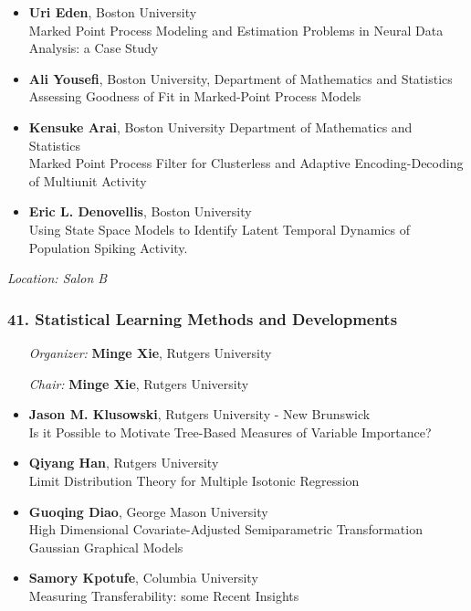 \begin{itemize}
\item \textbf{Uri Eden}, Boston University \\
Marked Point Process Modeling and Estimation Problems in Neural Data Analysis: a Case Study
\item \textbf{Ali Yousefi}, Boston University, Department of Mathematics and Statistics \\
Assessing Goodness of Fit in Marked-Point Process Models
\item \textbf{Kensuke Arai}, Boston University Department of Mathematics and Statistics \\
Marked Point Process Filter for Clusterless and Adaptive Encoding-Decoding of Multiunit Activity
\item \textbf{Eric L. Denovellis}, Boston University \\
Using State Space Models to Identify Latent Temporal Dynamics of Population Spiking Activity.
\end{itemize}

\emph{Location: Salon B}

\subsubsection*{41. Statistical Learning Methods and Developments}

\begin{enumerate}[align=left]
\item [\emph{Organizer:}] \textbf{Minge Xie}, Rutgers University
\item [\emph{Chair:}] \textbf{Minge Xie}, Rutgers University
\end{enumerate}

\begin{itemize}
\item \textbf{Jason M. Klusowski}, Rutgers University - New Brunswick \\
Is it Possible to Motivate Tree-Based Measures of Variable Importance?
\item \textbf{Qiyang Han}, Rutgers University \\
Limit Distribution Theory for Multiple Isotonic Regression
\item \textbf{Guoqing Diao}, George Mason University \\
High Dimensional Covariate-Adjusted Semiparametric Transformation Gaussian Graphical Models
\item \textbf{Samory Kpotufe}, Columbia University \\
Measuring Transferability: some Recent Insights
\end{itemize}

